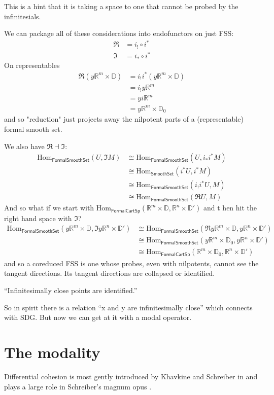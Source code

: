 \documentclass[12pt]{article}
\newcommand{\Hom}{\mathrm{Hom}}
\newcommand{\adj}{\dashv}
\newcommand{\rrn}{\ensuremath{\mathbb{R}^n}}
\newcommand{\rrm}{\ensuremath{\mathbb{R}^m}}
\newcommand{\dd}{\ensuremath{\mathbb{D}}}
\newcommand{\formalcart}{\textsf{FormalCartSp}}
\newcommand{\formalsmoothset}{\textsf{FormalSmoothSet}}
\newcommand{\smoothset}{\textsf{SmoothSet}}
\newcommand{\rmodal}{\Re}
\newcommand{\imodal}{\Im}
\begin{document}
This is a hint that it is taking a space to one that cannot be probed by the infinitesials.

We can package all of these considerations into endofunctors on just FSS:
\begin{align*}
\rmodal &= i_!\circ i^* \\
\imodal &= i_*\circ i^*
\end{align*}
On representables
\begin{align*}
\rmodal(y\rrm\times\dd) &= i_!i^*(y\rrm\times\dd) \\
&= i_!y\rrm \\
&= yi\rrm \\
&= y\rrm\times\dd_0
\end{align*}
and so "reduction" just projects away the nilpotent parts of a (representable) formal smooth set.

We also have $\rmodal\adj\imodal$:
\begin{align*}
\Hom_{\formalsmoothset}(U, \imodal M)&\cong\Hom_{\formalsmoothset}(U,i_* i^*M) \\
&\cong \Hom_{\smoothset}(i^*U, i^*M) \\
&\cong \Hom_{\formalsmoothset}(i_!i^*U, M) \\
&\cong \Hom_{\formalsmoothset}(\rmodal U, M)
\end{align*}
And so what if we start with $\Hom_{\formalcart}(\rrm\times\dd, \rrn\times\dd')$ and t hen hit the right hand space with $\imodal$?
\begin{align*}
\Hom_{\formalsmoothset}(y\rrm\times\dd, \imodal y\rrn\times\dd') &\cong \Hom_{\formalsmoothset}(\rmodal y\rrm\times\dd, y\rrn\times\dd') \\
&\cong \Hom_{\formalsmoothset}(y\rrm\times\dd_0, y\rrn\times\dd') \\
&\cong \Hom_{\formalcart}(\rrm\times\dd_0, \rrn\times\dd')
\end{align*}
and so a coreduced FSS is one whose probes, even with nilpotents, cannot see the tangent directions. Its tangent directions are collapsed or identified. 

“Infinitesimally close points are identified.”

So in spirit there is a relation “x and y are infinitesimally close” which connects with SDG. But now we can get at it with a modal operator.



\section{The modality}\label{sec:modality}
Differential cohesion is most gently introduced by Khavkine and Schreiber in \cite{khavkine_synthetic_2017} and plays a large role in Schreiber's magnum opus \cite{schreiber_differential_2013}.
\end{document}
